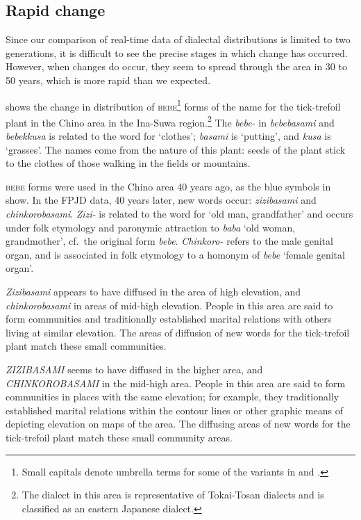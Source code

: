 \documentclass[output=paper]{LSP/langsci}
\begin{document}
\subsection{Rapid change}
Since our comparison of real-time data of dialectal distributions is limited to two generations, it is difficult to see the precise stages in which change has occurred. However, when changes do occur, they seem to spread through the area in 30 to 50 years, which is more rapid than we expected.

 shows the change in distribution of \textsc{bebe}\footnote{ Small capitals denote umbrella terms for some of the variants in  and .} forms of the name for the tick-trefoil plant in the Chino area in the Ina-Suwa region.\footnote{ The dialect in this area is representative of Tokai-Tosan dialects and is classified as an eastern Japanese dialect.} The \textit{bebe-} in \textit{bebebasami} and \textit{bebekkusa} is related to the word for `clothes'; \textit{basami} is `putting', and \textit{kusa} is `grasses'. The names come from the nature of this plant: seeds of the plant stick to the clothes of those walking in the fields or mountains.

\textsc{bebe} forms were used in the Chino area 40 years ago, as the blue symbols in  show. In the FPJD data, 40 years later, new words occur: \textit{zizibasami} and \textit{chinkorobasami}.  \textit{Zizi-} is related to the word for `old man, grandfather' and occurs under folk etymology and paronymic attraction to \textit{baba} `old woman, grandmother', cf.\ the original form \textit{bebe}. \textit{Chinkoro-} refers to the male genital organ, and is associated in folk etymology to a homonym of \textit{bebe} `female genital organ'.

\textit{Zizibasami} appears to have diffused in the area of high elevation, and \textit{chinkorobasami} in areas of mid-high elevation. People in this area are said to form communities and traditionally established marital relations with others living at similar elevation. The areas of diffusion of new words for the tick-trefoil plant match these small communities.

\textit{ZIZIBASAMI} seems to have diffused in the higher area, and \textit{CHINKOROBASAMI} in the mid-high area. People in this area are said to form communities in places with the same elevation; for example, they traditionally established marital relations within the contour lines or other graphic means of depicting elevation on maps of the area. The diffusing areas of new words for the tick-trefoil plant match these small community areas.
\end{document}
